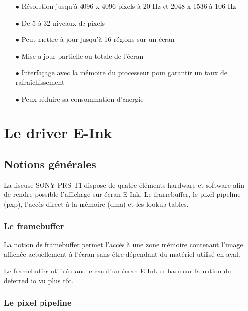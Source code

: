 \begin{itemize}
	\item[$\bullet$] Résolution jusqu'à 4096 x 4096 pixels à 20 Hz et 2048 x 1536 à 106 Hz
	\item[$\bullet$] De 5 à 32 niveaux de pixels
	\item[$\bullet$] Peut mettre à jour jusqu'à 16 régions sur un écran
	\item[$\bullet$] Mise a jour partielle ou totale de l'écran 
	\item[$\bullet$] Interfaçage avec la mémoire du processeur pour garantir un taux de rafraîchissement
	\item[$\bullet$] Peux réduire sa consommation d'énergie
\end{itemize}


\section{Le driver E-Ink}

\subsection{Notions générales}
La liseuse SONY PRS-T1 dispose de quatre éléments hardware et software afin 
de rendre possible l'affichage sur écran E-Ink. Le framebuffer, le pixel pipeline (pxp), l'accès direct à la mémoire (dma) et les lookup tables.

\subsubsection{Le framebuffer}

La notion de framebuffer permet l'accès à une zone mémoire contenant l'image affichée actuellement à l'écran sans être dépendant du matériel utilisé en aval.

Le framebuffer utilisé dans le cas d'un écran E-Ink se base sur la notion de deferred io vu plus tôt.

\subsubsection{Le pixel pipeline}

